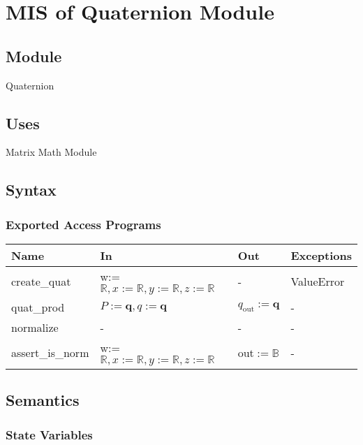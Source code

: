 \documentclass[12pt, titlepage]{article}
\begin{document}
\section{MIS of Quaternion Module} \label{qm}

\subsection{Module}
Quaternion

\subsection{Uses}
Matrix Math Module

\subsection{Syntax}


\subsubsection{Exported Access Programs}

\begin{center}
\begin{tabular}{p{2.5cm} p{6cm} p{2cm} p{1.5cm}}
\hline
\textbf{Name} & \textbf{In} & \textbf{Out} & \textbf{Exceptions} \\
\hline
create\_quat & w:=$\mathbb{R}, x:=\mathbb{R}, y:=\mathbb{R}, z:=\mathbb{R}$ & - &
ValueError \\
quat\_prod & $P:=\mathbf{q},  q:=\mathbf{q}$ & $q_\text{out}:=\mathbf{q}$ & - \\
normalize & - & - & - \\
assert\_is\_norm & w:=$\mathbb{R}, x:=\mathbb{R}, y:=\mathbb{R}, z:=\mathbb{R}$ & out$:=\mathbb{B}$ & - \\
\hline
\end{tabular}
\end{center}

\subsection{Semantics}

\subsubsection{State Variables}
\end{document}
